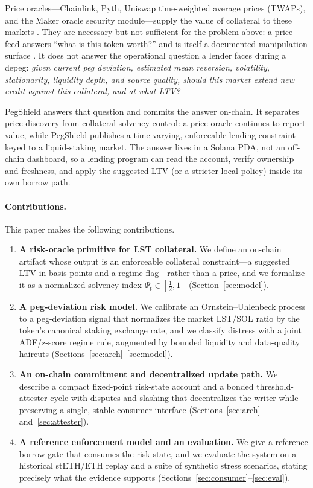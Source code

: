 \documentclass[aps,prx,reprint,nofootinbib,longbibliography]{revtex4-2}
\begin{document}
Price oracles---Chainlink, Pyth, Uniswap time-weighted average prices (TWAPs),
and the Maker oracle security module---supply the value of collateral to these
markets \cite{breidenbach2021chainlink,pyth2022whitepaper,adams2021uniswapv3,makerdao_oracle_module}.
They are necessary but not sufficient for the problem above: a price feed answers
``what is this token worth?'' and is itself a documented manipulation surface
\cite{eskandari2021sok,zhou2023sok,daian2020flashboys,rekt_mango_2022}. It does
not answer the operational question a lender faces during a depeg: \emph{given
current peg deviation, estimated mean reversion, volatility, stationarity,
liquidity depth, and source quality, should this market extend new credit against
this collateral, and at what LTV?}

PegShield answers that question and commits the answer on-chain. It separates
price discovery from collateral-solvency control: a price oracle continues to
report value, while PegShield publishes a time-varying, enforceable lending
constraint keyed to a liquid-staking market. The answer lives in a Solana PDA, not
an off-chain dashboard, so a lending program can read the account, verify ownership
and freshness, and apply the suggested LTV (or a stricter local policy) inside its
own borrow path.

\paragraph{Contributions.}
This paper makes the following contributions.
\begin{enumerate}
\item \textbf{A risk-oracle primitive for LST collateral.} We define an on-chain
artifact whose output is an enforceable collateral constraint---a suggested LTV in
basis points and a regime flag---rather than a price, and we formalize it as a
normalized solvency index $\Psi_t\in[\tfrac12,1]$ (Section~\ref{sec:model}).
\item \textbf{A peg-deviation risk model.} We calibrate an Ornstein--Uhlenbeck
process to a peg-deviation signal that normalizes the market LST/SOL ratio by the
token's canonical staking exchange rate, and we classify distress with a joint
ADF/z-score regime rule, augmented by bounded liquidity and data-quality haircuts
(Sections~\ref{sec:arch}--\ref{sec:model}).
\item \textbf{An on-chain commitment and decentralized update path.} We describe a
compact fixed-point risk-state account and a bonded threshold-attester cycle with
disputes and slashing that decentralizes the writer while preserving a single,
stable consumer interface (Sections~\ref{sec:arch} and~\ref{sec:attester}).
\item \textbf{A reference enforcement model and an evaluation.} We give a
reference borrow gate that consumes the risk state, and we evaluate the system on a
historical stETH/ETH replay and a suite of synthetic stress scenarios, stating
precisely what the evidence supports (Sections~\ref{sec:consumer}--\ref{sec:eval}).
\end{enumerate}
\end{document}
